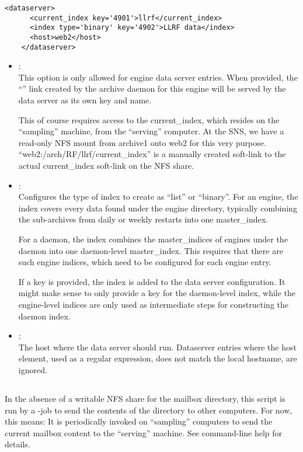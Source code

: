 \begin{lstlisting}[frame=none,keywordstyle=\sffamily]
    <dataserver>
      <current_index key='4901'>llrf</current_index>
      <index type='binary' key='4902'>LLRF data</index>
      <host>web2</host>
    </dataserver>
\end{lstlisting}

\begin{itemize}
\item {}:\\
      This option is only allowed for engine data server entries.
      When provided, the ``'' link created by the
      archive daemon for this engine will be served by the
      data server as its own key and name.

      This of course requires access to the current\_index, which
      resides on the ``sampling'' machine, from the ``serving''
      computer. At the SNS, we have a read-only NFS mount from
      archive1 onto web2 for this very purpose.
      ``web2:/arch/RF/llrf/current\_index'' is a manually
      created soft-link to the actual current\_index soft-link on the
      NFS share.
\item {}: \\
      Configures the type of index to create as ``list'' or ``binary''.
      For an engine, the index covers every data found under the engine
      directory, typically combining the sub-archives from daily or weekly
      restarts into one master\_index.

      For a daemon, the index combines the master\_indices of engines
      under the daemon into one daemon-level master\_index. This
      requires that there are such engine indices, which need to be
      configured for each engine entry.

      If a key is provided, the index is added to the data server
      configuration. It might make sense to only provide a key for the
      daemon-level index, while the engine-level indices are only used
      as intermediate steps for constructing the daemon index.            
\item {}: \\
      The host where the data server should run. Dataserver entries where
      the host element, used as a regular expression, does not match the
      local hostname, are ignored.
\end{itemize}

\subsection{}
In the absence of a writable NFS share for the mailbox directory,
this script is run by a -job to send the contents of the
 directory to other computers.
For now, this means: It is periodically invoked on ``sampling''
computers to send the current mailbox content to the ``serving''
machine. See command-line help for details.

